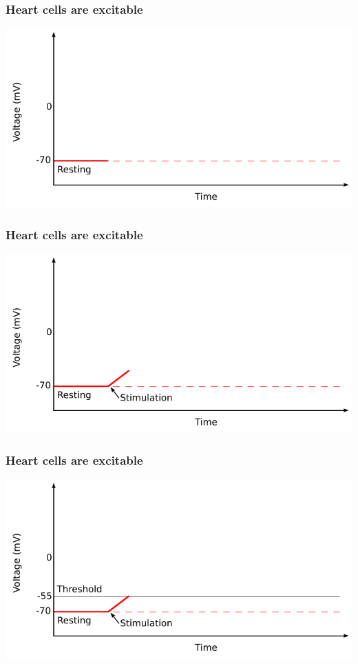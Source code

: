 \documentclass[norsk, 12pt]{beamer}
\begin{document}
\begin{frame}[fragile]
\frametitle{Heart cells are excitable}
\begin{center}
\includegraphics[width=\textwidth]{ap0.pdf}
\end{center}
\end{frame}

\begin{frame}[fragile]
\frametitle{Heart cells are excitable}
\begin{center}
\includegraphics[width=\textwidth]{ap1.pdf}
\end{center}
\end{frame}

\begin{frame}[fragile]
\frametitle{Heart cells are excitable}
\begin{center}
\includegraphics[width=\textwidth]{ap2.pdf}
\end{center}
\end{frame}
\end{document}

